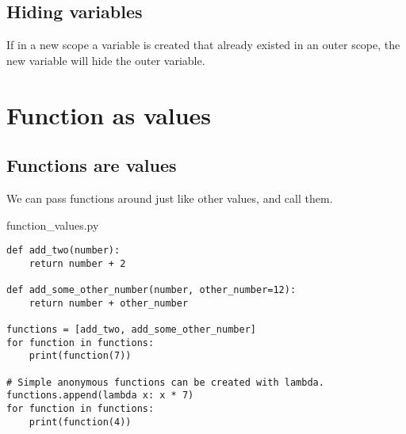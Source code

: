 \documentclass[aspectratio=1610,slidestop]{beamer}
\begin{document}
\begin{pframe}
 \addtocounter{framenumber}{-1}
 \begin{center}
  
 \end{center}
\end{pframe}


\subsection{Hiding variables}
\begin{pframe}
 If in a new scope a variable is created that already existed in an outer scope,
 the new variable will hide the outer variable.
\end{pframe}



\section{Function as values}

\subsection{Functions are values}
\begin{pframe}
 We can pass functions around just like other values, and call them.
 \begin{pythonfile}{function\_values.py}
  \begin{verbatim}
def add_two(number):
    return number + 2

def add_some_other_number(number, other_number=12):
    return number + other_number

functions = [add_two, add_some_other_number]
for function in functions:
    print(function(7))

# Simple anonymous functions can be created with lambda.
functions.append(lambda x: x * 7)
for function in functions:
    print(function(4))
  \end{verbatim}
 \end{pythonfile}
\end{pframe}
\end{document}
